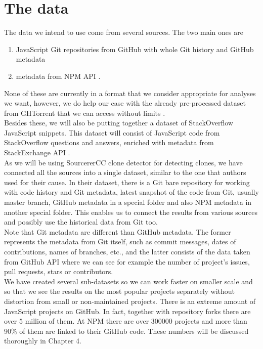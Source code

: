 \documentclass[thesis=M,english]{FITthesis}[2012/10/20]
\begin{document}
\chapter{The data}

The data we intend to use come from several sources. The two main ones are

\begin{enumerate}
\item JavaScript Git repositories from GitHub with whole Git history and GitHub metadata
\item metadata from NPM API \cite{npm}.
\end{enumerate}

None of these are currently in a format that we consider appropriate for analyses we want, however, we do help our case with the already pre-processed dataset from GHTorrent that we can access without limits \cite{ghtorrent}. \\

Besides these, we will also be putting together a dataset of StackOverflow JavaScript snippets. This dataset will consist of JavaScript code from StackOverflow questions and answers, enriched with metadata from StackExchange API \cite{so_api}. \\

As we will be using SourcererCC \cite{scc_1} clone detector for detecting clones, we have connected all the sources into a single dataset, similar to the one that authors used for their cause. In their dataset, there is a Git bare repository for working with code history and Git metadata, latest snapshot of the code from Git, usually master branch, GitHub metadata in a special folder and also NPM metadata in another special folder. This enables us to connect the results from various sources and possibly use the historical data from Git too. \\

Note that Git metadata are different than GitHub metadata. The former represents the metadata from Git itself, such as commit messages, dates of contributions, names of branches, etc., and the latter consists of the data taken from GitHub API \cite{gh_api} where we can see for example the number of project’s issues, pull requests, stars or contributors. \\

We have created several sub-datasets so we can work faster on smaller scale and so that we see the results on the most popular projects separately without distortion from small or non-maintained projects. There is an extreme amount of JavaScript projects on GitHub. In fact, together with repository forks there are over $5$ million of them. At NPM there are over $300000$ projects and more than 90\% of them are linked to their GitHub code. These numbers will be discussed thoroughly in Chapter 4. \\
\end{document}
